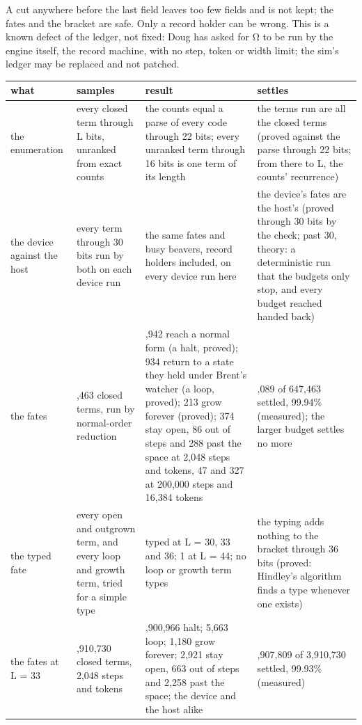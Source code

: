 A cut anywhere before the last field leaves too few fields and is not kept; the fates and the bracket are safe. Only a record holder can be wrong. This is a known defect of the ledger, not fixed: Doug has asked for Ω to be run by the engine itself, the record machine, with no step, token or width limit; the sim's ledger may be replaced and not patched.

{\footnotesize
\setlength{\tabcolsep}{6pt}
\begin{longtable}{>{\RaggedRight\arraybackslash}p{}>{\RaggedRight\arraybackslash}p{}>{\RaggedRight\arraybackslash}p{}>{\RaggedRight\arraybackslash}p{}}
\toprule
what & samples & result & settles \\
\midrule
\endhead
the enumeration & every closed term through L bits, unranked from exact counts & the counts equal a parse of every code through 22 bits; every unranked term through 16 bits is one term of its length & the terms run are all the closed terms (proved against the parse through 22 bits; from there to L, the counts' recurrence) \\
the device against the host & every term through 30 bits run by both on each device run & the same fates and busy beavers, record holders included, on every device run here & the device's fates are the host's (proved through 30 bits by the check; past 30, theory: a deterministic run that the budgets only stop, and every budget reached handed back) \\
the fates & 647,463 closed terms, run by normal-order reduction & 645,942 reach a normal form (a halt, proved); 934 return to a state they held under Brent's watcher (a loop, proved); 213 grow forever (proved); 374 stay open, 86 out of steps and 288 past the space at 2,048 steps and tokens, 47 and 327 at 200,000 steps and 16,384 tokens & 647,089 of 647,463 settled, 99.94\% (measured); the larger budget settles no more \\
the typed fate & every open and outgrown term, and every loop and growth term, tried for a simple type & 0 typed at L = 30, 33 and 36; 1 at L = 44; no loop or growth term types & the typing adds nothing to the bracket through 36 bits (proved: Hindley's algorithm finds a type whenever one exists) \\
the fates at L = 33 & 3,910,730 closed terms, 2,048 steps and tokens & 3,900,966 halt; 5,663 loop; 1,180 grow forever; 2,921 stay open, 663 out of steps and 2,258 past the space; the device and the host alike & 3,907,809 of 3,910,730 settled, 99.93\% (measured) \\

\end{longtable}}
